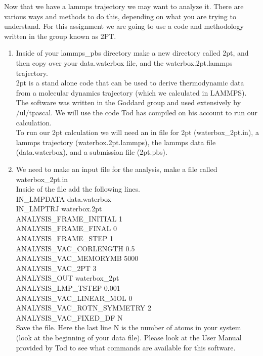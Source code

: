 \documentclass{article}
\begin{document}
Now that we have a lammps trajectory we may want to analyze it. 
There are various ways and methods to do this, depending on what you are trying to understand. 
For this assignment we are going to use a code and methodology written in the group known as 2PT. 
\begin{enumerate}
    \item Inside of your lammps\_pbs directory make a new directory called 2pt, and then copy over your data.waterbox file, and the waterbox.2pt.lammps trajectory.\\
2pt is a stand alone code that can be used to derive thermodynamic data from a molecular dynamics trajectory (which we calculated in LAMMPS). 
The software was written in the Goddard group and used extensively by /ul/tpascal.
We will use the code Tod has compiled on his account to run our calculation.\\
To run our 2pt calculation we will need an in file for 2pt (waterbox\_2pt.in), a lammps trajectory (waterbox.2pt.lammps), the lammps data file (data.waterbox), and a submission file (2pt.pbs).

\item We need to make an input file for the analysis, make a file called waterbox\_2pt.in\\
Inside of the file add the following lines. \\
IN\_LMPDATA data.waterbox\\
IN\_LMPTRJ waterbox.2pt\\
ANALYSIS\_FRAME\_INITIAL 1\\
ANALYSIS\_FRAME\_FINAL 0\\
ANALYSIS\_FRAME\_STEP 1\\
ANALYSIS\_VAC\_CORLENGTH 0.5\\
ANALYSIS\_VAC\_MEMORYMB 5000\\
ANALYSIS\_VAC\_2PT 3\\
ANALYSIS\_OUT waterbox\_2pt\\
ANALYSIS\_LMP\_TSTEP 0.001\\
ANALYSIS\_VAC\_LINEAR\_MOL 0\\
ANALYSIS\_VAC\_ROTN\_SYMMETRY 2\\
ANALYSIS\_VAC\_FIXED\_DF N\\

Save the file.
Here the last line N is the number of atoms in your system (look at the beginning of your data file). 
Please look at the User Manual provided by Tod to see what commands are available for this software. \\


\end{enumerate}
\end{document}

